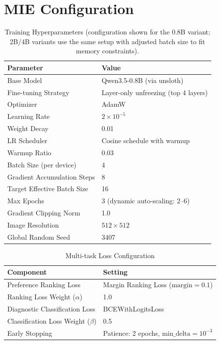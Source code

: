 \documentclass{article}
\begin{document}
\section{MIE Configuration}
\label{sec:appendix_configuration}


\begin{table}[H]
\centering
\caption{Training Hyperparameters (configuration shown for the 0.8B variant; 2B/4B variants use the same setup with adjusted batch size to fit memory constraints).}
\label{tab:training_hparams}
\renewcommand{\arraystretch}{1.1}
\begin{tabular}{l l}
\toprule
\textbf{Parameter} & \textbf{Value} \\
\midrule
Base Model & Qwen3.5-0.8B (via unsloth) \\
Fine-tuning Strategy & Layer-only unfreezing (top 4 layers) \\
Optimizer & AdamW \\
Learning Rate & $2 \times 10^{-5}$ \\
Weight Decay & 0.01 \\
LR Scheduler & Cosine schedule with warmup \\
Warmup Ratio & 0.03 \\
Batch Size (per device) & 4 \\
Gradient Accumulation Steps & 8 \\
Target Effective Batch Size & 16 \\
Max Epochs & 3 (dynamic auto-scaling: 2--6) \\
Gradient Clipping Norm & 1.0 \\
Image Resolution & $512 \times 512$ \\
Global Random Seed & 3407 \\
\bottomrule
\end{tabular}
\end{table}

\begin{table}[H]
\centering
\caption{Multi-task Loss Configuration}
\label{tab:loss_config}
\renewcommand{\arraystretch}{1.1}
\begin{tabular}{l l}
\toprule
\textbf{Component} & \textbf{Setting} \\
\midrule
Preference Ranking Loss & Margin Ranking Loss ($\text{margin} = 0.1$) \\
Ranking Loss Weight ($\alpha$) & 1.0 \\
Diagnostic Classification Loss & BCEWithLogitsLoss \\
Classification Loss Weight ($\beta$) & 0.5 \\
Early Stopping & Patience: 2 epochs, $\text{min\_delta} = 10^{-3}$ \\
\bottomrule
\end{tabular}
\end{table}
\end{document}
